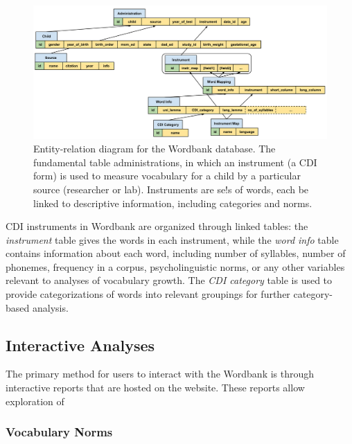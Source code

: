 \documentclass[man,noapacite]{apa2}
\begin{document}
\begin{figure}[t]
\centering
\includegraphics[width=4.5in]{figures/entities.pdf}
\caption{\label{fig:entities} Entity-relation diagram for the Wordbank database. The fundamental table administrations, in which an instrument (a CDI form) is used to measure vocabulary for a child by a particular source (researcher or lab). Instruments are se!s of words, each be linked to descriptive information, including categories and norms.}
\end{figure}

CDI instruments in Wordbank are organized through linked tables: the \emph{instrument} table gives the words in each instrument, while the \emph{word info} table contains information about each word, including number of syllables, number of phonemes, frequency in a corpus, psycholinguistic norms, or any other variables relevant to analyses of vocabulary growth. The \emph{CDI category} table is used to provide categorizations of words into relevant groupings for further category-based analysis.

\subsection{Interactive Analyses}

The primary method for users to interact with the Wordbank is through interactive reports that are hosted on the website. These reports allow exploration of 

\subsubsection{Vocabulary Norms}
\end{document}
